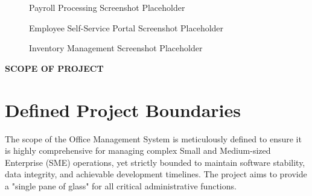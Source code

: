 ﻿\documentclass[12pt,a4paper]{report}
\begin{document}
\newpage
\begin{figure}[H]
    \centering
    \fbox{\rule{0pt}{1.8in} \rule{0.7\textwidth}{0pt}}
    \caption{Payroll Processing Screenshot Placeholder}
\end{figure}
\vspace{0.5cm}
\begin{figure}[H]
    \centering
    \fbox{\rule{0pt}{1.8in} \rule{0.7\textwidth}{0pt}}
    \caption{Employee Self-Service Portal Screenshot Placeholder}
\end{figure}
\vspace{0.5cm}
\begin{figure}[H]
    \centering
    \fbox{\rule{0pt}{1.8in} \rule{0.7\textwidth}{0pt}}
    \caption{Inventory Management Screenshot Placeholder}
\end{figure}

\newpage
\vspace*{\fill}
\begin{center}
{\LARGE \textbf{SCOPE OF PROJECT}}
\end{center}
\vspace*{\fill}

\newpage
\section*{Defined Project Boundaries}
The scope of the Office Management System is meticulously defined to ensure it is highly comprehensive for managing complex Small and Medium-sized Enterprise (SME) operations, yet strictly bounded to maintain software stability, data integrity, and achievable development timelines. The project aims to provide a "single pane of glass" for all critical administrative functions.
\end{document}
